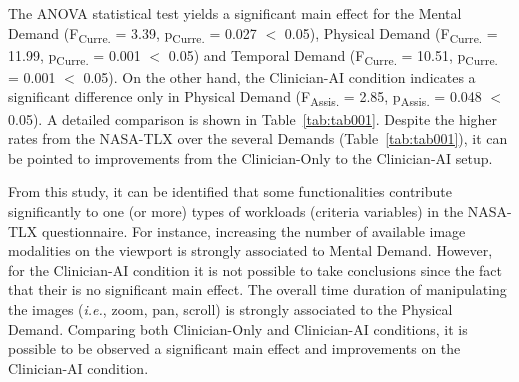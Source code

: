 


The \ac{ANOVA} statistical test yields a significant main effect for the Mental Demand (F\textsubscript{Curre.} = 3.39, p\textsubscript{Curre.} = 0.027 $<$ 0.05), Physical Demand (F\textsubscript{Curre.} = 11.99, p\textsubscript{Curre.} = 0.001 $<$ 0.05) and Temporal Demand (F\textsubscript{Curre.} = 10.51, p\textsubscript{Curre.} = 0.001 $<$ 0.05).
On the other hand, the Clinician-AI condition indicates a significant difference only in Physical Demand (F\textsubscript{Assis.} = 2.85, p\textsubscript{Assis.} = 0.048 $<$ 0.05). A detailed comparison is shown in Table~\ref{tab:tab001}.
Despite the higher rates from the \ac{NASA-TLX} over the several Demands (Table~\ref{tab:tab001}), it can be pointed to improvements from the Clinician-Only to the Clinician-AI setup.

From this study, it can be identified that some functionalities contribute significantly to one (or more) types of workloads (criteria variables) in the \ac{NASA-TLX} questionnaire.
For instance, increasing the number of available image modalities on the viewport is strongly associated to Mental Demand.
However, for the Clinician-AI condition it is not possible to take conclusions since the fact that their is no significant main effect.
The overall time duration of manipulating the images ({\it i.e.}, zoom, pan, scroll) is strongly associated to the Physical Demand.
Comparing both Clinician-Only and Clinician-AI conditions, it is possible to be observed a significant main effect and improvements on the Clinician-AI condition.

